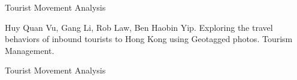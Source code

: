 \documentclass[
 size=14pt,
 paper=smartboard,  %
 mode=present, 		%
 display=slides, 	%
 style=tuliplab,  	%
 pauseslide,
 fleqn,leqno]{powerdot}
\begin{document}
\begin{slide}[toc=,bm=]{Tourist Movement Analysis}

\begin{figure}[htbp]
\end{figure}

Huy Quan Vu, Gang Li, Rob Law, Ben Haobin Yip. Exploring the travel behaviors of inbound tourists to Hong Kong using Geotagged photos. Tourism Management.


\end{slide}


\begin{slide}[toc=,bm=]{Tourist Movement Analysis}


\end{slide}
\end{document}
